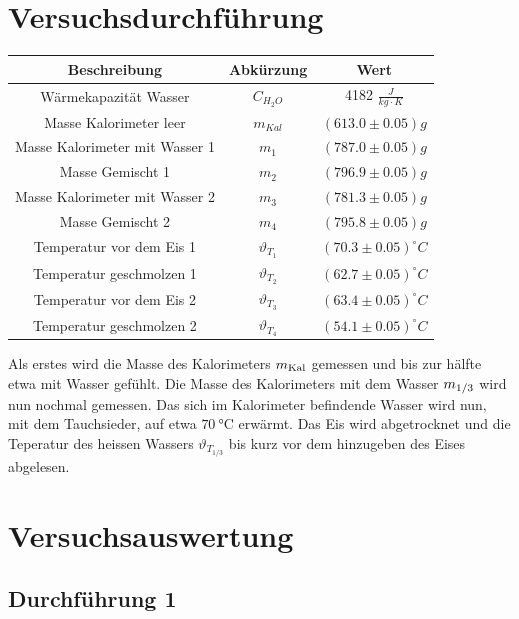 \documentclass[a4 paper, 11pt]{article}
\begin{document}
\section{Versuchsdurchführung}
\begin{table}[H]
    \centering
    \begin{tabular}{|c|c|c|}
        \hline
        \textbf{Beschreibung} & \textbf{Abkürzung} & \textbf{Wert} \\
        \hline
        Wärmekapazität Wasser & $C_{H_{2}O}$ & 4182 $\frac{J}{kg\cdot{}K}$\\
        \hline
        Masse Kalorimeter leer & $m_{Kal}$ & $(613.0\pm 0.05)g$\\
        Masse Kalorimeter mit Wasser 1 & $m_{1}$ & $(787.0\pm 0.05)g$\\
        \hline
        Masse Gemischt 1 & $m_{2}$ & $(796.9\pm 0.05)g$\\
        Masse Kalorimeter mit Wasser 2 & $m_{3}$ & $(781.3\pm 0.05)g$\\
    Masse Gemischt 2 & $m_{4}$ & $(795.8\pm 0.05)g$\\
        \hline
        Temperatur vor dem Eis 1 & $\vartheta_{T_{1}}$ & $(70.3\pm 0.05)^{\circ}C$\\
        Temperatur geschmolzen 1 & $\vartheta_{T_{2}}$ & $(62.7\pm 0.05) ^{\circ}C$\\
        \hline
        Temperatur vor dem Eis 2 & $\vartheta_{T_{3}}$ & $(63.4\pm 0.05)^{\circ}C$\\
        Temperatur geschmolzen 2 & $\vartheta_{T_{4}}$ & $(54.1\pm 0.05) ^{\circ}C$\\
        \hline
    \end{tabular}
\end{table}
Als erstes wird die Masse des Kalorimeters $m_{\rm{Kal}} $ gemessen  und bis zur hälfte etwa mit Wasser gefühlt. Die Masse des Kalorimeters mit dem Wasser $m_{\rm{1/3}} $ wird nun nochmal gemessen. Das sich im Kalorimeter befindende Wasser wird nun, mit dem Tauchsieder, auf etwa   $\SI{70}{\celsius} $ erwärmt. Das Eis wird abgetrocknet und die Teperatur des heissen Wassers $\vartheta_{T_{1/3}} $ bis kurz vor dem hinzugeben des Eises abgelesen. 
\section{Versuchsauswertung}

\subsection{Durchführung 1}
\end{document}
